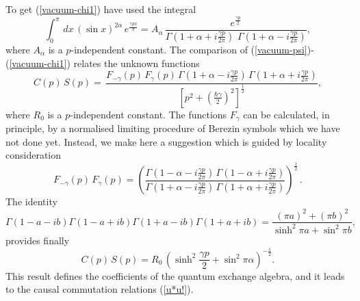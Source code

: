 \documentclass[a4paper,12pt]{article}
\begin{document}
To get (\ref{vacuum-chi1}) have used the integral
\begin{equation}\label{integral}
\int_0^{\pi}\,dx\, (\sin x)^{2\alpha}\,e^{\frac{\gamma px}{\pi}}=A_\alpha
\,\frac{e^{\frac{\gamma p}{2}}}{\Gamma
(1+\alpha+i\frac{\gamma p}{2\pi})\,\,
\Gamma(1+\alpha -i\frac{\gamma p}{2\pi})},
\end{equation}
where $A_\alpha$ is a $p$-independent constant.
The comparison of (\ref{vacuum-psi})-(\ref{vacuum-chi1}) relates
the unknown functions
\begin{equation}\label{C,S-F}
C(p)\,S(p)=\,\frac{F_{-\gamma}(p)\,F_{\gamma}(p)\,
\Gamma(1+\alpha-i\frac{\gamma p}{2\pi})\,
\Gamma(1+\alpha+i\frac{\gamma p}{2\pi})}
{[p^2+(\frac{\hbar\gamma}{2})^2]^{\frac{1}{2}}},
\end{equation}
where $R_0$ is a $p$-independent constant.
 The functions $F_\gamma$ can be calculated, in principle, by
a normalised limiting procedure of Berezin symbols
which we have not done yet.
Instead, we make here a suggestion which is guided by
locality consideration \cite{Thorn,OW}
\begin{equation}\label{F.F}
F_{-\gamma}(p)\,F_{\gamma}(p)=
\left(\frac{\Gamma(1-\alpha-i\frac{\gamma p}{2\pi})\,
\Gamma(1-\alpha+i\frac{\gamma p}{2\pi})}
{\Gamma(1+\alpha-i\frac{\gamma p}{2\pi})\,
\Gamma(1+\alpha+i\frac{\gamma p}{2\pi})}
\right)^\frac{1}{2}\,.
\end{equation}
The identity
\begin{equation}\label{Gamma.Gamma}
\Gamma(1-a-ib)\Gamma(1-a+ib)
\Gamma(1+a-ib)\Gamma(1+a+ib)=
\frac{(\pi a)^2+(\pi b)^2}{\sinh^2\pi a +\sin^2\pi b},
\end{equation}
provides finally
\begin{equation}\label{C.S}
C(p)\,S(p)=R_0\,\left(\sinh^2\frac{\gamma p}{2}+
\sin^2\pi\alpha\right)^{-\frac{1}{2}}.
\end{equation}
This result defines the
coefficients of the quantum exchange
algebra, and it  leads to the causal commutation relations
(\ref{u*u!}).



\vspace{0.5cm}
\end{document}
